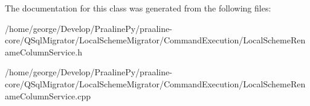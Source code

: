 The documentation for this class was generated from the following files\+:\begin{DoxyCompactItemize}
\item 
/home/george/\+Develop/\+Praaline\+Py/praaline-\/core/\+Q\+Sql\+Migrator/\+Local\+Scheme\+Migrator/\+Command\+Execution/Local\+Scheme\+Rename\+Column\+Service.\+h\item 
/home/george/\+Develop/\+Praaline\+Py/praaline-\/core/\+Q\+Sql\+Migrator/\+Local\+Scheme\+Migrator/\+Command\+Execution/Local\+Scheme\+Rename\+Column\+Service.\+cpp\end{DoxyCompactItemize}
